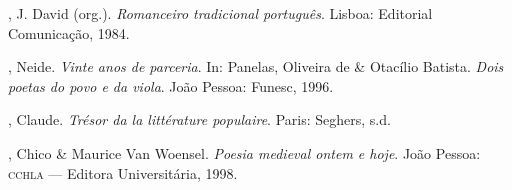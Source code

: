 \begin{bibliografia}[]
, J. David (org.). \textit{Romanceiro tradicional português}. Lisboa: Editorial Comunicação, 1984.

, Neide. \textit{Vinte anos de parceria}. In: Panelas, Oliveira de \& Otacílio Batista. \textit{Dois poetas do
povo e da viola}. João Pessoa: Funesc, 1996.

, Claude. \textit{Trésor da la littérature populaire}. Paris: Seghers, s.d.

, Chico \& Maurice Van Woensel. \textit{Poesia medieval ontem e hoje}. João Pessoa: \textsc{cchla} --- Editora Universitária,
1998.

\end{bibliografia}
